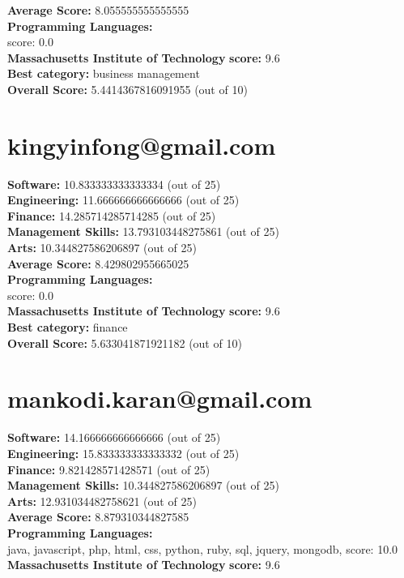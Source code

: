 \documentclass{article}
\begin{document}
\textbf{Average Score: } 8.055555555555555\\
\textbf{Programming Languages:} \\
score: 0.0\\
\textbf{Massachusetts Institute of Technology} \textbf{score:} 9.6\\
\textbf{Best category: } business management\\
\textbf{Overall Score: }5.4414367816091955 (out of 10)\section{kingyinfong@gmail.com}
\textbf{Software:} 10.833333333333334 (out of 25)\\
\textbf{Engineering: } 11.666666666666666 (out of 25)\\
\textbf{Finance:} 14.285714285714285 (out of 25)\\
\textbf{Management Skills:} 13.793103448275861 (out of 25)\\
\textbf{Arts:} 10.344827586206897 (out of 25)\\
\textbf{Average Score: } 8.429802955665025\\
\textbf{Programming Languages:} \\
score: 0.0\\
\textbf{Massachusetts Institute of Technology} \textbf{score:} 9.6\\
\textbf{Best category: } finance\\
\textbf{Overall Score: }5.633041871921182 (out of 10)\section{mankodi.karan@gmail.com}
\textbf{Software:} 14.166666666666666 (out of 25)\\
\textbf{Engineering: } 15.833333333333332 (out of 25)\\
\textbf{Finance:} 9.821428571428571 (out of 25)\\
\textbf{Management Skills:} 10.344827586206897 (out of 25)\\
\textbf{Arts:} 12.931034482758621 (out of 25)\\
\textbf{Average Score: } 8.879310344827585\\
\textbf{Programming Languages:} \\
java, javascript, php, html, css, python, ruby, sql, jquery, mongodb, score: 10.0\\
\textbf{Massachusetts Institute of Technology} \textbf{score:} 9.6\\
\end{document}
